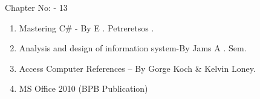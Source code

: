 \documentclass{article} %
\begin{document}
\noindent 

\noindent 

\noindent 

\noindent 

\noindent 

\noindent 

\noindent 

\noindent 

\noindent 

\noindent 

\noindent 

\noindent 

\noindent 

\noindent 

\noindent 

\noindent 

\noindent \textbf{                               }

\noindent                                                               Chapter No: - 13 

\noindent \textbf{                                        }\underbar{}

\noindent \textbf{}

\noindent 

\begin{enumerate}
\item  Mastering C\# - By E . Petreretsos . 

\item  Analysis and design of information system-By Jams A . Sem. 

\item  Access Computer References -- By Gorge Koch \& Kelvin Loney. 

\item  MS Office 2010 (BPB Publication) 
\end{enumerate}

\noindent \underbar{}

\noindent \underbar{}

\noindent \textbf{}\underbar{}

\noindent \textbf{}\underbar{}

\noindent \textbf{}\underbar{}

\noindent \textbf{}\underbar{}

\noindent \textbf{}\underbar{}

\noindent \underbar{}

\noindent 
\end{document}
